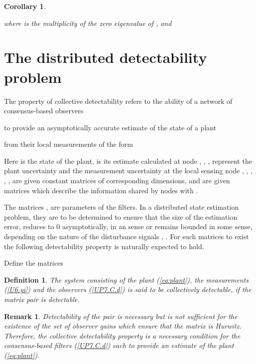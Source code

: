 \documentclass[a4paper,10pt,conference]{ieeeconf}
\newtheorem{definition}{Definition}
\newtheorem{remark}{Remark}
\newtheorem{corollary}{Corollary}
\begin{document}
\begin{corollary}\label{L.eigenvectors}

where  is the multiplicity of the zero eigenvalue of , and 

\end{corollary}
\mbox{}

\section{The distributed detectability problem}\label{main}

The property of collective detectability refers to the ability of a network
of consensus-based observers 
 
to provide an asymptotically accurate estimate of the state of a plant 

from their local measurements of the form 

Here  is the state of the plant,  is its 
estimate calculated at node , , ,  represent the plant
uncertainty and the measurement uncertainty at the local sensing node ,
, , , ,  are given constant matrices of
corresponding dimensions, and  are given matrices
which describe the information shared by nodes  with
. 

The matrices ,  are parameters of the filters.
In a distributed state estimation problem,  they are
to be determined to ensure that the size of the estimation error,  reduces to 0 asymptotically, in an  sense 
or remains bounded in some sense, depending on
the nature of the disturbance signals 
, . For such matrices to exist the following detectability
property is naturally expected to hold.

Define the matrices


\begin{definition}
The system consisting of the plant (\ref{eq:plant}), the measurements
(\ref{U6.yi}) and the observers (\ref{UP7.C.d}) is said to be \emph{collectively
detectable}, if the matrix pair  
 is detectable.
\end{definition} 

\begin{remark}
Detectability of the pair  is necessary but
is not sufficient for the existence of the set of observer gains 
which ensure that the matrix 
 is
Hurwitz. Therefore, 
the collective detectability property is a necessary condition for the
consensus-based filters (\ref{UP7.C.d}) each to provide an
estimate of the plant (\ref{eq:plant}).
\end{remark}
\end{document}
